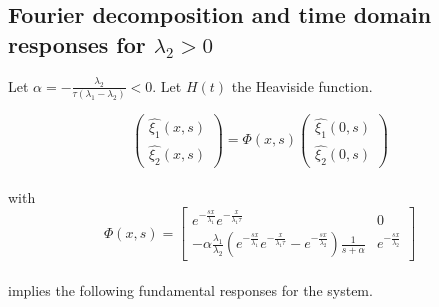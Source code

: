 \documentclass[preprint]{elsarticle}
\begin{document}
\subsection{Fourier decomposition and time domain responses for $\lambda_{2}>0$}

Let $\alpha=-\frac{\lambda_{2}}{\tau\left(\lambda_{1}-\lambda_{2}\right)}<0$.
Let $H\left(t\right)$ the Heaviside function.

\[
\left(\begin{array}{c}
\widehat{\xi_{1}}\left(x,s\right)\\
\widehat{\xi_{2}}\left(x,s\right)
\end{array}\right)=\Phi\left(x,s\right)\left(\begin{array}{c}
\widehat{\xi_{1}}\left(0,s\right)\\
\widehat{\xi_{2}}\left(0,s\right)
\end{array}\right)
\]
\\
with 
\[
\Phi\left(x,s\right)=\left[\begin{array}{cc}
e^{-\frac{sx}{\lambda_{1}}}e^{-\frac{x}{\lambda_{1}\tau}} & 0\\
-\alpha\frac{\lambda_{1}}{\lambda_{2}}\left(e^{-\frac{sx}{\lambda_{1}}}e^{-\frac{x}{\lambda_{1}\tau}}-e^{-\frac{sx}{\lambda_{2}}}\right)\frac{1}{s+\alpha} & e^{-\frac{sx}{\lambda_{2}}}
\end{array}\right]
\]
\\
implies the following fundamental responses for the system.
\end{document}
